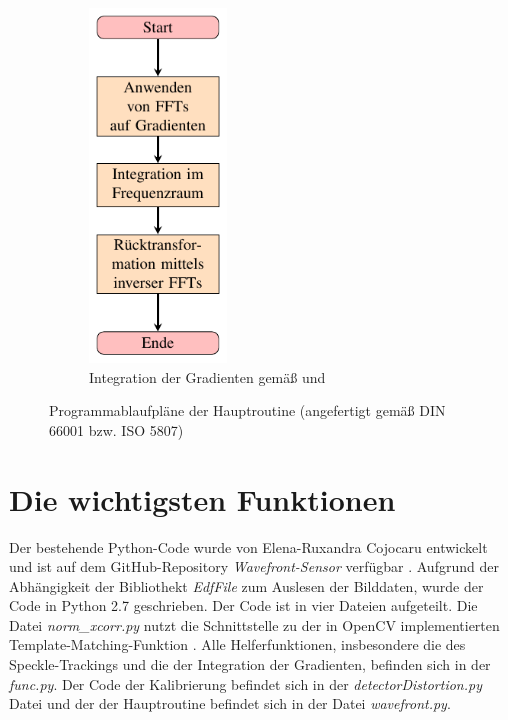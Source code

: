 \begin{figure}[htbp]
\begin{subfigure}[b]{0.45\textwidth}
		\includegraphics[width=0.4\textwidth]{pdf/graph_fc}
		\caption[Frankot-Chellappa]{Integration der Gradienten gemäß \cite{FC88} und \cite{Kov04}}
		\label{fig:graph_fc}
	\end{subfigure}
	\caption[Algorithmen]{Programmablaufpläne der Hauptroutine (angefertigt gemäß DIN 66001 bzw. ISO 5807)}
\end{figure}

\section{Die wichtigsten Funktionen}

Der bestehende Python-Code wurde von Elena-Ruxandra Cojocaru entwickelt und ist auf dem GitHub-Repository \textit{Wavefront-Sensor} verfügbar \cite{Coj17}. Aufgrund der Abhängigkeit der Bibliothekt \textit{EdfFile} zum Auslesen der Bilddaten, wurde der Code in Python 2.7 geschrieben. Der Code ist in vier Dateien aufgeteilt. Die Datei \textit{norm\_xcorr.py} nutzt die Schnittstelle zu der in OpenCV implementierten Template-Matching-Funktion \cite{SA17}. Alle Helferfunktionen, insbesondere die des Speckle-Trackings und die der Integration der Gradienten, befinden sich in der \textit{func.py}. Der Code der Kalibrierung befindet sich in der \textit{detectorDistortion.py} Datei und der der Hauptroutine befindet sich in der Datei \textit{wavefront.py}. 

